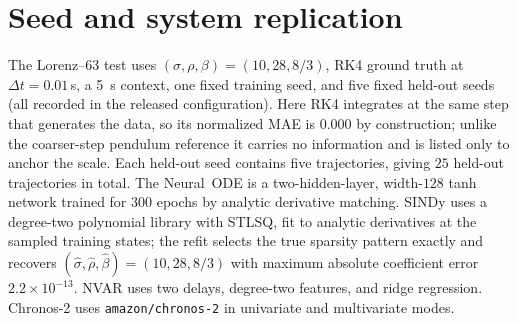 \documentclass{article}
\begin{document}
\section{Seed and system replication}
The Lorenz--63 test uses $(\sigma,\rho,\beta)=(10,28,8/3)$, RK4 ground truth at $\Delta t{=}0.01$\,s, a 5~s
context, one fixed training seed, and five fixed held-out seeds (all recorded in the released
configuration). Here RK4 integrates at the same step that generates the data, so its normalized
MAE is $0.000$ by construction; unlike the coarser-step pendulum reference it carries no
information and is listed only to anchor the scale. Each held-out seed contains five trajectories, giving $25$ held-out
trajectories in total. The Neural~ODE is a two-hidden-layer, width-$128$ tanh network trained
for $300$ epochs by analytic derivative matching. SINDy uses a degree-two polynomial library
with STLSQ, fit to analytic derivatives at the sampled training states; the refit selects the
true sparsity pattern exactly and recovers
$(\hat\sigma,\hat\rho,\hat\beta)=(10,28,8/3)$ with maximum absolute coefficient error
$2.2\times10^{-13}$. NVAR uses two delays, degree-two features, and ridge regression.
Chronos-2 uses \texttt{amazon/chronos-2} in univariate and multivariate modes.
\end{document}

